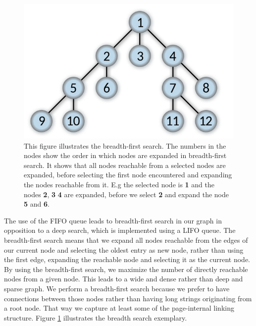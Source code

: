 \begin{figure}
	\centering
	\includegraphics[scale=0.35]{resources/breadth-first}
	\caption{This figure illustrates the breadth-first search. The numbers in the nodes show the order in which nodes are expanded in breadth-first search. It shows that all nodes reachable from a selected nodes are expanded, before selecting the first node encountered and expanding the nodes reachable from it. E.g the selected node is \textbf{1} and the nodes \textbf{2}, \textbf{3} \textbf{4} are expanded, before we select \textbf{2} and expand the node \textbf{5} and \textbf{6}.}
	\label{datacrawler_breadth_search}
\end{figure}

The use of the FIFO queue leads to breadth-first search in our graph in opposition to a deep search, which is implemented using a LIFO queue. The breadth-first search means that we expand all nodes reachable from the edges of our current node and selecting the oldest entry as new node, rather than using the first edge, expanding the reachable node and selecting it as the current node. By using the breadth-first search, we maximize the number of directly reachable nodes from a given node. This leads to a wide and dense rather than deep and sparse graph. We perform a breadth-first search because we prefer to have connections between those nodes rather than having long strings originating from a root node. That way we capture at least some of the page-internal linking structure. Figure \ref{datacrawler_breadth_search} illustrates the breadth search exemplary.

